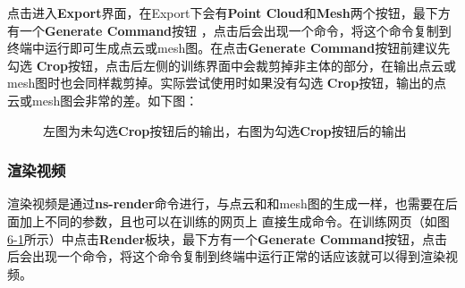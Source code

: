 \documentclass{nwputhesis}
\begin{document}
\indent
点击进入\textbf{Export}界面，在{Export}下会有\textbf{Point Cloud}和\textbf{Mesh}两个按钮，最下方有一个\textbf{Generate Command}按钮
，点击后会出现一个命令，将这个命令复制到终端中运行即可生成点云或mesh图。在点击\textbf{Generate Command}按钮前建议先勾选
\textbf{Crop}按钮，点击后左侧的训练界面中会裁剪掉非主体的部分，在输出点云或mesh图时也会同样裁剪掉。实际尝试使用时如果没有勾选
\textbf{Crop}按钮，输出的点云或mesh图会非常的差。如下图：
\begin{figure}[H]
    \centering
    \hspace{1cm} %
    \caption{左图为未勾选\textbf{Crop}按钮后的输出，右图为勾选\textbf{Crop}按钮后的输出}
\end{figure}
\subsubsection{渲染视频}
渲染视频是通过\textbf{ns-render}命令进行，与点云和和mesh图的生成一样，也需要在后面加上不同的参数，且也可以在训练的网页上
直接生成命令。在训练网页（如图\hyperlink{6-1}{6-1}所示）中点击\textbf{Render}板块，最下方有一个\textbf
{Generate Command}按钮，点击后会出现一个命令，将这个命令复制到终端中运行正常的话应该就可以得到渲染视频。\\
\end{document}
